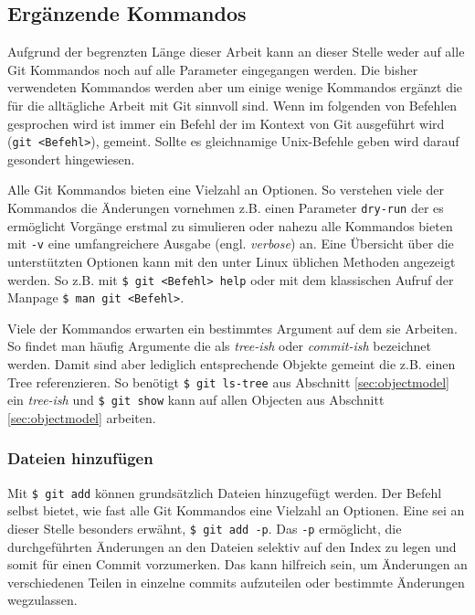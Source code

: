 \subsection{Ergänzende Kommandos}\label{sec:commands}
Aufgrund der begrenzten Länge dieser Arbeit kann an dieser Stelle weder auf
alle Git Kommandos noch auf alle Parameter eingegangen werden. Die bisher
verwendeten Kommandos werden aber um einige wenige Kommandos ergänzt die für
die alltägliche Arbeit mit Git sinnvoll sind. Wenn im folgenden von Befehlen
gesprochen wird ist immer ein Befehl der im Kontext von Git ausgeführt wird
(\texttt{git <Befehl>}), gemeint. Sollte es gleichnamige Unix-Befehle geben
wird darauf gesondert hingewiesen.

Alle Git Kommandos bieten eine Vielzahl an Optionen. So verstehen viele der
Kommandos die Änderungen vornehmen z.B. einen Parameter \texttt{dry-run} der es
ermöglicht Vorgänge erstmal zu simulieren oder nahezu alle Kommandos bieten mit
\texttt{-v} eine umfangreichere Ausgabe (engl. \textit{verbose}) an. Eine
Übersicht über die unterstützten Optionen kann mit den unter Linux üblichen
Methoden angezeigt werden. So z.B. mit \texttt{\$ git <Befehl> help} oder mit
dem klassischen Aufruf der Manpage \texttt{\$ man git <Befehl>}.

Viele der Kommandos erwarten ein bestimmtes Argument auf dem sie Arbeiten. So
findet man häufig Argumente die als \textit{tree-ish} oder \textit{commit-ish}
bezeichnet werden. Damit sind aber lediglich entsprechende Objekte gemeint die
z.B. einen Tree referenzieren.\cite[52]{gitosp} So benötigt \texttt{\$ git
ls-tree} aus Abschnitt \ref{sec:objectmodel} ein \textit{tree-ish} und
\texttt{\$ git show} kann auf allen Objecten aus Abschnitt
\ref{sec:objectmodel} arbeiten.

\subsubsection{Dateien hinzufügen}\label{sec:gitadd}
Mit \texttt{\$ git add} können grundsätzlich Dateien hinzugefügt werden. Der
Befehl selbst bietet, wie fast alle Git Kommandos eine Vielzahl an Optionen.
Eine sei an dieser Stelle besonders erwähnt, \texttt{\$ git add -p}. Das
\texttt{-p} ermöglicht, die durchgeführten Änderungen an den Dateien selektiv
auf den Index zu legen und somit für einen Commit vorzumerken. Das kann
hilfreich sein, um Änderungen an verschiedenen Teilen in einzelne
\glspl{commit} aufzuteilen oder bestimmte Änderungen
wegzulassen.\cite[S.~36-37]{gitosp}

